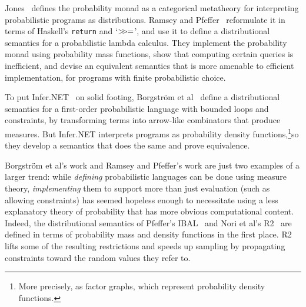 \documentclass{llncs}
\begin{document}
Jones~\cite{cit:jones-1990thesis} defines the probability monad as a categorical metatheory for interpreting probabilistic programs as distributions.
Ramsey and Pfeffer~\cite{cit:ramsey-2002popl-stochastic-short} reformulate it in terms of Haskell's \texttt{return} and `${>}\mspace{-6mu}{>}\mspace{-1mu}{=}$', and use it to define a distributional semantics for a probabilistic lambda calculus.
They implement the probability monad using probability mass functions, show that computing certain queries is inefficient, and devise an equivalent semantics that is more amenable to efficient implementation, for programs with finite probabilistic choice.

\newcommand{\factorgraphfootnote}{\footnote{More precisely, as factor graphs, which represent probability density functions.}}

To put Infer.NET~\cite{cit:inferdotnet} on solid footing, Borgstr\"om et al~\cite{cit:borgstrom-2011esop-measure-transformer} define a distributional semantics for a first-order probabilistic language with bounded loops and constraints, by transforming terms into arrow-like combinators that produce measures.
But Infer.NET interprets programs as probability density functions,\factorgraphfootnote so they develop a semantics that does the same and prove equivalence.

Borgstr\"om et al's work and Ramsey and Pfeffer's work are just two examples of a larger trend: while \emph{defining} probabilistic languages can be done using measure theory, \emph{implementing} them to support more than just evaluation (such as allowing constraints) has seemed hopeless enough to necessitate using a less explanatory theory of probability that has more obvious computational content.
Indeed, the distributional semantics of Pfeffer's IBAL~\cite{cit:pfeffer-2007chapter-ibal} and Nori et al's R2~\cite{cit:nori-2014aaai-preimage} are defined in terms of probability mass and density functions in the first place.
R2 lifts some of the resulting restrictions and speeds up sampling by propagating constraints toward the random values they refer to.

\end{document}
